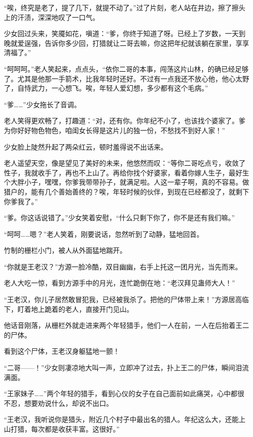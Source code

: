 \begin{this_body}
“唉，终究是老了，提了几下，就提不动了。”过了片刻，老人站在井边，擦了擦头上的汗渍，深深地叹了一口气。

少女回过头来，笑魇如花，嗔道：“爹，你终于知道了呀。已经上了岁数，一天到晚就爱逞强，告诉你多少回，打猎就让二哥去嘛，你这把年纪就该躺在家里，享享清福了。”

“呵呵呵。”老人笑起来，点点头，“依你二哥的本事，闯荡这片山林，的确已经足够了。尤其是他那一手箭术，比我年轻时还好。不过有一点我还不放心他，他心太野了，自恃武力，一心想飞。唉，年轻人爱幻想，多少都有这个毛病。”

“爹……”少女拖长了音调。

老人笑得更欢畅了，打趣道：“对，还有你。你年纪不小了，也该找个婆家了。爹为你好好物色物色，咱闺女长得是这片儿的独一份，不愁找不到好人家！”

少女脸上陡然升起了两朵红云，顿时羞得说不出话来。

老人遥望天空，像是望见了美好的未来，他悠然而叹：“等你二哥吃点亏，收敛了性子，我就收手了，再也不上山了。再给你找个好婆家，看着你嫁人生子，最好生个大胖小子，嘿嘿，你爹我带带孙子，就满足啦。人这一辈子啊，真的不容易。做猎户的，能有几个善始善终的？唉，年轻时候的伙伴，到现在已经都没了，就剩下你爹我了。”

“爹。你这话说错了。”少女笑着安慰，“什么只剩下你了，你不是还有我们嘛。”

“呵呵……嗯？”老人笑着，刚要说话，忽然听到了动静，猛地回首。

竹制的栅栏小门，被人从外面猛地踹开。

“你就是王老汉？”方源一脸冷酷，双目幽幽，右手上托这一团月光，当先而来。

老人大吃一惊，看到方源手中的月光，连忙跪倒在地：“老汉拜见蛊师大人！”

“王老汉，你儿子居然敢冒犯我，已经被我杀了。把他的尸体带上来！”方源居高临下，盯着地上跪着的老人，直接开门见山。

他话音刚落，从栅栏外就走进来两个年轻猎手，他们一人在前，一人在后抬着王二的尸体。

看到这个尸体，王老汉身躯猛地一颤！

“二哥——！”少女则凄凉地大叫一声，立即冲了过去，扑上王二的尸体，瞬间泪流满面。

“王家妹子……”两个年轻的猎手，看到心仪的女子在自己面前如此痛哭，心中都很不忍，想要劝说什么，却说不出口。

“王老汉，我听说你是猎头，附近几个村子中最出名的猎人。年纪这么大，还能上山打猎，每次都是收获丰富。这很好。”


\end{this_body}
